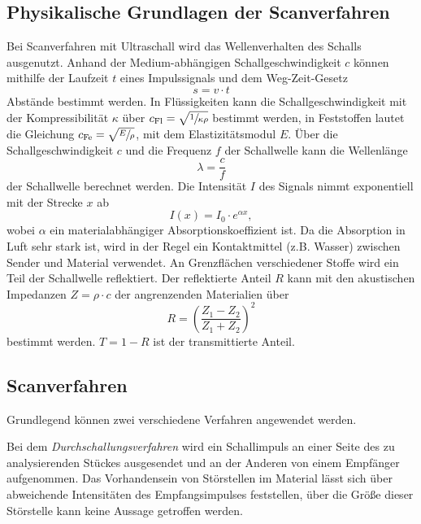 \subsection{Physikalische Grundlagen der Scanverfahren}
\label{subsec:Grundlagen}
Bei Scanverfahren mit Ultraschall wird das Wellenverhalten des Schalls ausgenutzt. Anhand der Medium-abhängigen Schallgeschwindigkeit $c$ können mithilfe der
Laufzeit $t$ eines Impulssignals und dem Weg-Zeit-Gesetz
\begin{equation}
    \label{eqn:WegZeit}
    s = v \cdot t
\end{equation} 
Abstände bestimmt werden.
In Flüssigkeiten kann die Schallgeschwindigkeit mit der Kompressibilität $\kappa$ über $c_\text{Fl} = \sqrt{\sfrac{1}{\kappa \rho}}$ bestimmt werden, in Feststoffen
lautet die Gleichung $c_\text{Fe} = \sqrt{\sfrac{E}{\rho}}$, mit dem Elastizitätsmodul $E$. Über die Schallgeschwindigkeit $c$ und die Frequenz $f$ der Schallwelle 
kann die Wellenlänge
\begin{equation}
    \label{eqn:lambda}
    \lambda = \frac{c}{f}
\end{equation}
der Schallwelle berechnet werden.
Die Intensität $I$ des Signals nimmt exponentiell mit der Strecke $x$ ab
\begin{equation*}
    I(x) = I_0 \cdot e^{\alpha x},
\end{equation*}
wobei $\alpha$ ein materialabhängiger Absorptionskoeffizient ist. Da die Absorption in Luft sehr stark ist, wird in der Regel ein Kontaktmittel (z.B. Wasser) zwischen
Sender und Material verwendet.
An Grenzflächen verschiedener Stoffe wird ein Teil der Schallwelle reflektiert. Der reflektierte Anteil $R$ kann mit den akustischen Impedanzen $Z = \rho \cdot c$ der 
angrenzenden Materialien über
\begin{equation*}
    \label{eqn:Reflektion}
    R = \left(\frac{Z_1 - Z_2}{Z_1 + Z_2}\right)^2
\end{equation*}
bestimmt werden. $T = 1 - R$ ist der transmittierte Anteil.

\subsection{Scanverfahren}
\label{subsec:Scanverfahren}
Grundlegend können zwei verschiedene Verfahren angewendet werden. 

Bei dem \textit{Durchschallungsverfahren} wird ein Schallimpuls an einer Seite des zu analysierenden Stückes ausgesendet und an der Anderen von einem Empfänger 
aufgenommen. Das Vorhandensein von Störstellen im Material lässt sich über abweichende Intensitäten des Empfangsimpulses feststellen, über die Größe dieser Störstelle
kann keine Aussage getroffen werden.

